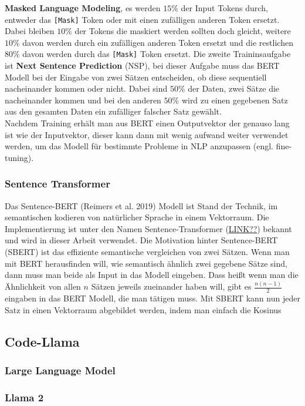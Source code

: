 \documentclass[12pt,letterpaper,ngerman]{article}
\begin{document}
{\bf Masked Language Modeling}, es werden $15\%$ der Input
Tokens durch, entweder das \verb|[Mask]| Token oder mit einen
zufälligen anderen Token ersetzt. Dabei bleiben 
$10\%$ der Tokens die maskiert werden sollten doch gleicht,
weitere $10\%$ davon werden durch ein zufälligen anderen Token
ersetzt und die restlichen $80\%$ davon werden durch
das \verb|[Mask]| Token ersetzt. Die zweite Traininsaufgabe
ist {\bf Next Sentence Prediction} (NSP), bei dieser Aufgabe
muss das BERT Modell bei der Eingabe von zwei Sätzen entscheiden,
ob diese sequentiell nacheinander kommen oder nicht. Dabei sind
$50\%$ der Daten, zwei Sätze die nacheinander kommen und
bei den anderen $50\%$ wird zu einen gegebenen Satz aus den gesamten
Daten ein zufälliger falscher Satz gewählt. \\ 
Nachdem Training erhält man aus BERT einen Outputvektor der genauso
lang ist wie der Inputvektor, dieser kann dann mit wenig aufwand
weiter verwendet werden, um das Modell für bestimmte Probleme in NLP
anzupassen (engl. fine-tuning).

\subsubsection{Sentence Transformer}
Das Sentence-BERT (Reimers et al. 2019) Modell ist Stand der Technik,
im semantischen kodieren von natürlicher Sprache in einem Vektorraum.
Die Implementierung ist unter den Namen Sentence-Transformer (\underline{LINK??})
bekannt und wird in dieser Arbeit verwendet. Die Motivation hinter Sentence-BERT
(SBERT) ist das effiziente semantische vergleichen von zwei Sätzen. Wenn man mit
BERT herausfinden will, wie semantisch ähnlich zwei gegebene Sätze sind, dann muss 
man beide als Input in das Modell eingeben. Dass heißt wenn man die Ähnlichkeit
von allen $n$ Sätzen jeweils zueinander haben will, gibt es $\frac{n(n-1)}{2}$
eingaben in das BERT Modell, die man tätigen muss. Mit SBERT kann nun jeder
Satz in einen Vektorraum abgebildet werden, indem man einfach die Kosinus

\subsection{Code-Llama}
\subsubsection{Large Language Model}
\subsubsection{Llama 2}
\end{document}
